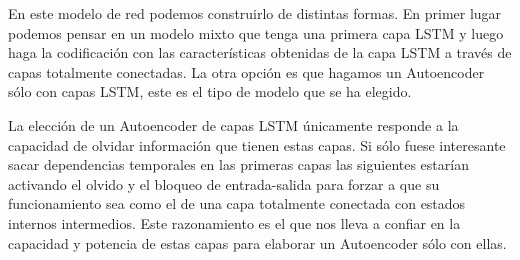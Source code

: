 En este modelo de red podemos construirlo de distintas formas. En primer lugar podemos pensar en un modelo mixto que tenga una primera capa LSTM y luego haga la codificación con las características obtenidas de la capa LSTM a través de capas totalmente conectadas. La otra opción es que hagamos un Autoencoder sólo con capas LSTM, este es el tipo de modelo que se ha elegido. 

La elección de un Autoencoder de capas LSTM únicamente responde a la capacidad de olvidar información que tienen estas capas. Si sólo fuese interesante sacar dependencias temporales en las primeras capas las siguientes estarían activando el olvido y el bloqueo de entrada-salida para forzar a que su funcionamiento sea como el de una capa totalmente conectada con estados internos intermedios. Este razonamiento es el que nos lleva a confiar en la capacidad y potencia de estas capas para elaborar un Autoencoder sólo con ellas.

